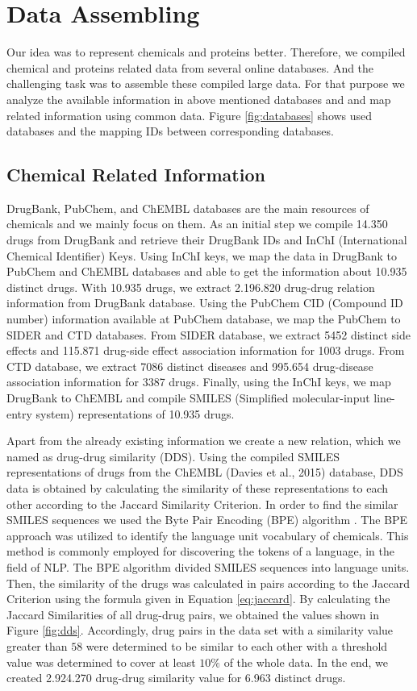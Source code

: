 \section{Data Assembling}
\label{section:data_assembling}
Our idea was to represent chemicals and proteins better. Therefore, we compiled chemical and proteins related data from several online databases. And the challenging task was to assemble these compiled large data. For that purpose we analyze the available information in above mentioned databases and and map related information using common data. Figure \ref{fig:databases} shows used databases and the mapping IDs between corresponding databases.

\subsection{Chemical Related Information}
DrugBank, PubChem, and ChEMBL databases are the main resources of chemicals and we mainly focus on them. As an initial step we compile 14.350 drugs from DrugBank and retrieve their DrugBank IDs and InChI (International Chemical Identifier) Keys. Using InChI keys, we map the data in DrugBank to PubChem and ChEMBL databases and able to get the information about 10.935 distinct drugs. With 10.935 drugs, we extract 2.196.820 drug-drug relation information from DrugBank database. Using the PubChem CID (Compound ID number) information available at PubChem database, we map the PubChem to SIDER and CTD databases. From SIDER database, we extract 5452 distinct side effects and 115.871 drug-side effect association information for 1003 drugs. From CTD database, we extract 7086 distinct diseases and 995.654 drug-disease association information for 3387 drugs. Finally, using the InChI keys, we map DrugBank to ChEMBL and compile SMILES (Simplified molecular-input line-entry system) representations of 10.935 drugs. 

Apart from the already existing information we create a new relation, which we named as drug-drug similarity (DDS). Using the compiled SMILES representations of drugs from the ChEMBL (Davies et al., 2015) database, DDS data is obtained by calculating the similarity of these representations to each other according to the Jaccard Similarity Criterion. In order to find the similar SMILES sequences we used the Byte Pair Encoding (BPE) algorithm \cite{sennrich2015neural}. The BPE approach was utilized to identify the language unit vocabulary of chemicals. This method is commonly employed for discovering the tokens of a language, in the field of NLP. The BPE algorithm divided SMILES sequences into language units. Then, the similarity of the drugs was calculated in pairs according to the Jaccard Criterion using the formula given in Equation \ref{eq:jaccard}. By calculating the Jaccard Similarities of all drug-drug pairs, we obtained the values shown in Figure \ref{fig:dds}. Accordingly, drug pairs in the data set with a similarity value greater than $58$ were determined to be similar to each other with a threshold value was determined to cover at least $10\%$ of the whole data. In the end, we created 2.924.270 drug-drug similarity value for 6.963 distinct drugs.

